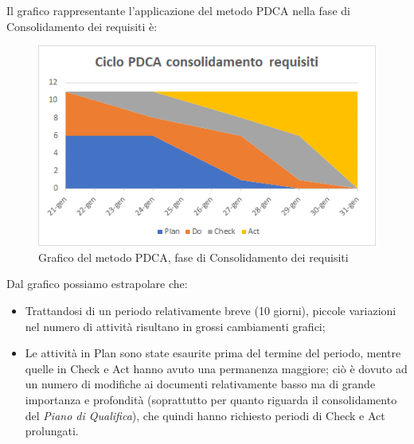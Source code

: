 Il grafico rappresentante l'applicazione del metodo PDCA nella fase di Consolidamento dei requisiti è:
\begin{figure} [H]
	\centering
	\includegraphics[scale=1]{Img/Ciclo_PDCA_consolidamento_requisiti}
	\caption{Grafico del metodo PDCA, fase di Consolidamento dei requisiti}\label{}
\end{figure}
Dal grafico possiamo estrapolare che:
\begin{itemize}
	\item Trattandosi di un periodo relativamente breve (10 giorni), piccole variazioni nel numero di attività risultano in grossi cambiamenti grafici;
	\item Le attività in Plan sono state esaurite prima del termine del periodo, mentre quelle in Check e Act hanno avuto una permanenza maggiore; ciò è dovuto ad un numero di modifiche ai documenti relativamente basso ma di grande importanza e profondità (soprattutto per quanto riguarda il consolidamento del \emph{Piano di Qualifica}), che quindi hanno richiesto periodi di Check e Act prolungati.
\end{itemize}

\pagebreak

